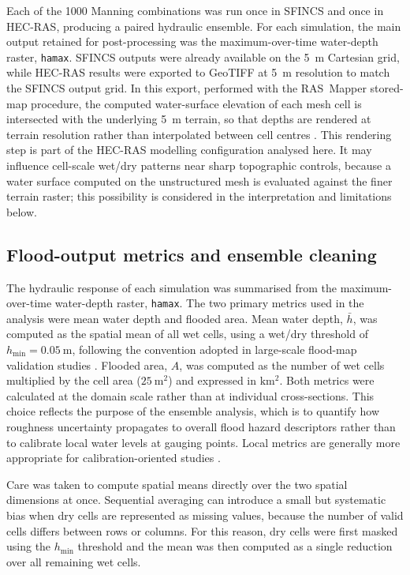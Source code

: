 \documentclass[a4paper,fleqn]{cas-sc}
\newcommand{\sfincs}{\textsc{SFINCS}}
\newcommand{\hecras}{\textsc{HEC-RAS}}
\begin{document}
Each of the \num{1000} Manning combinations was run once in \sfincs{} and once in \hecras{}, producing a paired hydraulic ensemble. For each simulation, the main output retained for post-processing was the maximum-over-time water-depth raster, \texttt{hamax}. \sfincs{} outputs were already available on the 5~m Cartesian grid, while \hecras{} results were exported to GeoTIFF at 5~m resolution to match the \sfincs{} output grid. In this export, performed with the RAS~Mapper stored-map procedure, the computed water-surface elevation of each mesh cell is intersected with the underlying 5~m terrain, so that depths are rendered at terrain resolution rather than interpolated between cell centres \citep{usace2026rasuser}. This rendering step is part of the \hecras{} modelling configuration analysed here. It may influence cell-scale wet/dry patterns near sharp topographic controls, because a water surface computed on the unstructured mesh is evaluated against the finer terrain raster; this possibility is considered in the interpretation and limitations below.


\subsection{Flood-output metrics and ensemble cleaning}\label{sec:metrics_cleaning}
The hydraulic response of each simulation was summarised from the maximum-over-time water-depth raster, \texttt{hamax}. The two primary metrics used in the analysis were mean water depth and flooded area. Mean water depth, $\bar{h}$, was computed as the spatial mean of all wet cells, using a wet/dry threshold of $h_{\min}=0.05~\mathrm{m}$, following the convention adopted in large-scale flood-map validation studies \citep{wing2019}. Flooded area, $A$, was computed as the number of wet cells multiplied by the
cell area ($25~\mathrm{m^2}$) and expressed in $\mathrm{km^2}$. Both metrics were calculated at the domain scale rather than at individual cross-sections. This choice reflects the purpose of the ensemble analysis, which is to quantify how roughness uncertainty propagates to overall flood hazard descriptors rather than to calibrate local water levels at gauging points. Local metrics are generally more appropriate for calibration-oriented studies \citep{pappenberger2005,domeneghetti2012}.

Care was taken to compute spatial means directly over the two spatial dimensions at once. Sequential averaging can introduce a small but systematic bias when dry cells are represented as missing values, because the number of valid cells differs between rows or columns. For this reason, dry cells were first masked using the $h_{\min}$ threshold and the mean was then computed as a single reduction over all remaining wet cells.
\end{document}
